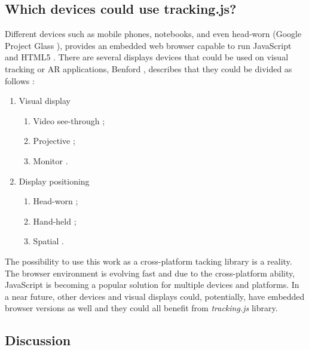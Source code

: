 \subsection{Which devices could use tracking.js?} %
\label{sub:basic_concepts:visual_tracking:which_devices_could_use_trackingjs}

Different devices such as mobile phones, notebooks, and even head-worn \cite{Benford1998} (Google Project Glass \cite{Glass2013}), provides an embedded web browser capable to run JavaScript \cite{International2009} and HTML5 \cite{Hickson2013}. There are several displays devices that could be used on visual tracking or AR applications, Benford \cite{Benford1998}, describes that they could be divided as follows \cite{Benford1998}:

\begin{enumerate}
  \item Visual display \cite{Benford1998}
    \begin{enumerate}
      \item Video see-through \cite{Benford1998};
      \item Projective \cite{Benford1998};
      \item Monitor \cite{Benford1998}.
    \end{enumerate}

  \item Display positioning \cite{Benford1998}
    \begin{enumerate}
      \item Head-worn \cite{Benford1998};
      \item Hand-held \cite{Benford1998};
      \item Spatial \cite{Benford1998}.
    \end{enumerate}
\end{enumerate}

The possibility to use this work as a cross-platform tacking library is a reality. The browser environment is evolving fast and due to the cross-platform ability, JavaScript \cite{International2009} is becoming a popular solution for multiple devices and platforms. In a near future, other devices and visual displays could, potentially, have embedded browser versions as well and they could all benefit from \textit{tracking.js} library.


\subsection{Discussion} %
\label{sub:basic_concepts:visual_tracking:discussion}

